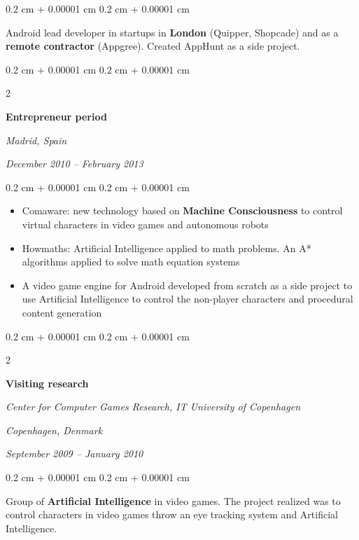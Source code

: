 \documentclass[10pt, letterpaper]{article}
\newenvironment{highlights}{
	\begin{itemize}[
		topsep=0.10 cm,
		parsep=0.10 cm,
		partopsep=0pt,
		itemsep=0pt,
		leftmargin=0.4 cm + 10pt
	]
	}{
	\end{itemize}
} %
\newenvironment{onecolentry}{
	\begin{adjustwidth}{
		0.2 cm + 0.00001 cm
	}{
		0.2 cm + 0.00001 cm
	}
	}{
	\end{adjustwidth}
} %
\newenvironment{twocolentry}[2][]{
	\onecolentry
	\def\secondColumn{#2}
	\setcolumnwidth{\fill, 5.5 cm}
	\begin{paracol}{2}
	}{
		\switchcolumn \raggedleft \secondColumn
	\end{paracol}
	\endonecolentry
} %
\begin{document}
	\vspace{0.10 cm}
	\begin{onecolentry}
		Android lead developer in startups in \textbf{London} (Quipper, Shopcade) and as a \textbf{remote contractor} (Appgree). Created AppHunt as a side project.
	\end{onecolentry}

	\vspace{0.2 cm}

	\begin{twocolentry}{
		\textit{Madrid, Spain}
		
		\textit{December 2010 – February 2013}}
		\textbf{Entrepreneur period}
	\end{twocolentry}

	\vspace{0.10 cm}
	\begin{onecolentry}
		\begin{highlights}
			\item Comaware: new technology based on \textbf{Machine Consciousness} to control virtual characters in video games and autonomous robots
			\item Howmaths: Artificial Intelligence applied to math problems. An A* algorithms applied to solve math equation systems
			\item A video game engine for Android developed from scratch as a side project to use Artificial Intelligence to control the non-player characters and procedural content generation
		\end{highlights}
	\end{onecolentry}

	\vspace{0.2 cm}

	\begin{twocolentry}{
		\textit{Copenhagen, Denmark}
		
		\textit{September 2009 – January 2010}}
		\textbf{Visiting research}
		
		\textit{Center for Computer Games Research, IT University of Copenhagen}
	\end{twocolentry}

	\vspace{0.10 cm}
	\begin{onecolentry}
		Group of \textbf{Artificial Intelligence} in video games. The project realized was to control characters in video games throw an eye tracking system and Artificial Intelligence.
	\end{onecolentry}
\end{document}
